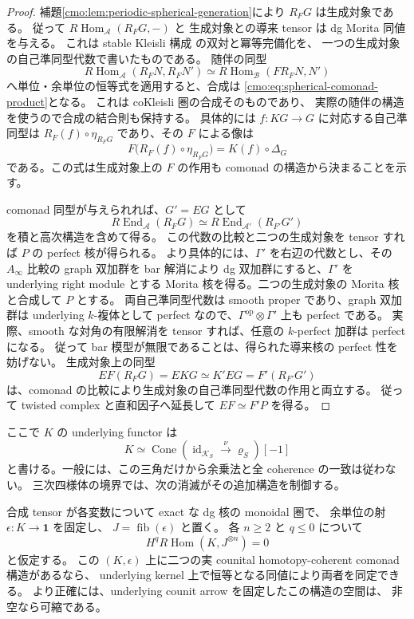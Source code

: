 \begin{proof}
補題\ref{cmo:lem:periodic-spherical-generation}により $R_FG$ は生成対象である。
従って $R\operatorname{Hom}_{\mathcal A}(R_FG,-)$ と
生成対象との導来 tensor は dg Morita 同値を与える。
これは stable Kleisli 構成
\cite[Proposition~1.11]{CMOChristSphericalMonadic}の双対と冪等完備化を、
一つの生成対象の自己準同型代数で書いたものである。
随伴の同型
\[
 R\operatorname{Hom}_{\mathcal A}(R_FN,R_FN')
 \simeq R\operatorname{Hom}_{\mathcal B}(F R_FN,N')
\]
へ単位・余単位の恒等式を適用すると、合成は
\eqref{cmo:eq:spherical-comonad-product}となる。
これは coKleisli 圏の合成そのものであり、
実際の随伴の構造を使うので合成の結合則も保持する。
具体的には $f:KG\to G$ に対応する自己準同型は
$R_F(f)\circ\eta_{R_FG}$ であり、その $F$ による像は
\[
 F\bigl(R_F(f)\circ\eta_{R_FG}\bigr)
   =K(f)\circ\Delta_G
\]
である。この式は生成対象上の $F$ の作用も comonad の構造から決まることを示す。

comonad 同型が与えられれば、$G'=EG$ として
\[
 R\operatorname{End}_{\mathcal A}(R_FG)
 \simeq R\operatorname{End}_{\mathcal A'}(R_{F'}G')
\]
を積と高次構造を含めて得る。
この代数の比較と二つの生成対象を tensor すれば $P$ の perfect 核が得られる。
より具体的には、$\Gamma'$ を右辺の代数とし、その $A_\infty$ 比較の graph 双加群を
bar 解消により dg 双加群にすると、$\Gamma'$ を underlying right module とする
Morita 核を得る。二つの生成対象の Morita 核と合成して $P$ とする。
両自己準同型代数は smooth proper であり、graph 双加群は underlying
$k$-複体として perfect なので、$\Gamma^{\mathrm{op}}\otimes\Gamma'$ 上も perfect である。
実際、smooth な対角の有限解消を tensor すれば、任意の $k$-perfect 加群は perfect になる。
従って bar 模型が無限であることは、得られた導来核の perfect 性を妨げない。
生成対象上の同型
\[
 EF(R_FG)=EKG\simeq K'EG=F'(R_{F'}G')
\]
は、comonad の比較により生成対象の自己準同型代数の作用と両立する。
従って twisted complex と直和因子へ延長して $EF\simeq F'P$ を得る。
\end{proof}

ここで $K$ の underlying functor は
\[
 K\simeq\operatorname{Cone}
     (\operatorname{id}_{\mathcal K_S}\xrightarrow{\nu}\varrho_S)[-1]
\]
と書ける。一般には、この三角だけから余乗法と全 coherence の一致は従わない。
三次四様体の境界では、次の消滅がその追加構造を制御する。

\begin{lemma}[正規化した余乗法の一意性]
\label{cmo:lem:normalized-comonad-uniqueness}
合成 tensor が各変数について exact な dg 核の monoidal 圏で、
余単位の射 $\epsilon:K\to\mathbf1$ を固定し、
$J=\operatorname{fib}(\epsilon)$ と置く。
各 $n\ge2$ と $q\le0$ について
\begin{equation}
\label{cmo:eq:normalized-comonad-vanishing}
 H^qR\operatorname{Hom}(K,J^{\otimes n})=0
\end{equation}
と仮定する。
この $(K,\epsilon)$ 上に二つの実 counital homotopy-coherent comonad 構造があるなら、
underlying kernel 上で恒等となる同値により両者を同定できる。
より正確には、underlying counit arrow を固定したこの構造の空間は、
非空なら可縮である。
\end{lemma}

